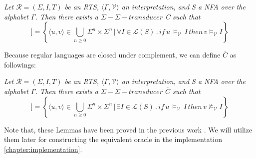 \begin{lemma}\label{lemma:abstractly_reachable}
    
\end{lemma}
\textit{
    Let $\mathcal{R} = (\Sigma, I, T)$ be an RTS, $\langle \Gamma, \mathcal{V} \rangle$ an interpretation, 
    and S a NFA over the alphabet $\Gamma$. Then there exists a  $\Sigma-\Sigma-transducer$ C such that
}
\begin{equation}
    [[C]] = \left\lbrace \langle u,v\rangle \in \bigcup_{n \geq 0} \Sigma^n \times \Sigma^n \, | \, \forall I \in \mathcal{L}(S) \, . \, if \, u \, \models_{\mathcal{V}} \, I \, then \, v \models_{\mathcal{V}} I \right\rbrace
\end{equation}

Because regular languages are closed under complement, we can define $\overline{C}$ as followings:
\begin{lemma}\label{lemma:abstractly_reachable2}
    
\end{lemma}
\textit{
    Let $\mathcal{R} = (\Sigma, I, T)$ be an RTS, $\langle \Gamma, \mathcal{V} \rangle$ an interpretation, 
    and S a NFA over the alphabet $\Gamma$. Then there exists a  $\Sigma-\Sigma-transducer$ $\overline{C}$ such that
}
\begin{equation}
    [[\overline{C}]] = \left\lbrace \langle u,v\rangle \in \bigcup_{n \geq 0} \Sigma^n \times \Sigma^n \, | \, \exists I \in \mathcal{L}(S) \, . \, if \, u \, \models_{\mathcal{V}} \, I \, then \, v \not\models_{\mathcal{V}} I \right\rbrace
\end{equation}

Note that, these Lemmas have been proved in the previous work \cite*{Welzel2023InductiveSts}.
We will utilize them later for constructing the equivalent oracle in the implementation \autoref{chapter:implementation}.